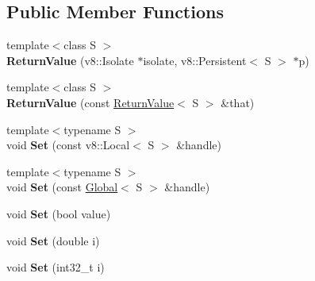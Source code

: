 \subsection*{Public Member Functions}
\begin{DoxyCompactItemize}
\item 
\mbox{\label{class_nan_1_1_return_value_a8e1a95ff6bc3022fbd8adfc96c09ba76}} 
{\footnotesize template$<$class S $>$ }\\{\bfseries Return\+Value} (v8\+::\+Isolate $\ast$isolate, v8\+::\+Persistent$<$ S $>$ $\ast$p)
\item 
\mbox{\label{class_nan_1_1_return_value_aa10effcefe01a53987ae1b94ca4248a2}} 
{\footnotesize template$<$class S $>$ }\\{\bfseries Return\+Value} (const \hyperlink{class_nan_1_1_return_value}{Return\+Value}$<$ S $>$ \&that)
\item 
\mbox{\label{class_nan_1_1_return_value_a81b25f47a86713e154f7b085be5c704a}} 
{\footnotesize template$<$typename S $>$ }\\void {\bfseries Set} (const v8\+::\+Local$<$ S $>$ \&handle)
\item 
\mbox{\label{class_nan_1_1_return_value_ac290c16f1665968c0657dd429442c1b2}} 
{\footnotesize template$<$typename S $>$ }\\void {\bfseries Set} (const \hyperlink{class_nan_1_1_global}{Global}$<$ S $>$ \&handle)
\item 
\mbox{\label{class_nan_1_1_return_value_a80bc86d2d7e312cee1f6226ff378aff3}} 
void {\bfseries Set} (bool value)
\item 
\mbox{\label{class_nan_1_1_return_value_a2e187f5168e9bac6cec3ba87ca9a61fa}} 
void {\bfseries Set} (double i)
\item 
\mbox{\label{class_nan_1_1_return_value_a1ce9a5989d99dded90b5d11e21c16b2d}} 
void {\bfseries Set} (int32\+\_\+t i)
\item 
\mbox{\label{class_nan_1_1_return_value_a66ba1330bf227f52b0efae3dc606d086}} 

\end{DoxyCompactItemize}
